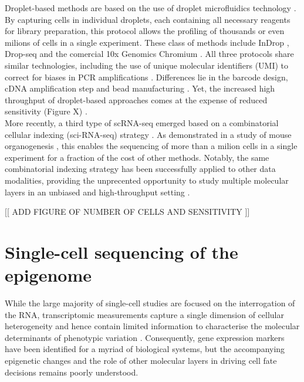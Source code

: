 Droplet-based methods are based on the use of droplet microfluidics technology \cite{Zhang2018}. By capturing cells in individual droplets, each containing all necessary reagents for library preparation, this protocol allows the profiling of thousands or even milions of cells in a single experiment. These class of methods include InDrop \cite{Klein2015,Zilionis2017}, Drop-seq\cite{Macosko2015} and the comercial 10x Genomics Chromium \cite{Zheng2017}. All three protocols share similar technologies, including the use of unique molecular identifiers (UMI) to correct for biases in PCR amplifications \cite{Kivioja2011}. Differences lie in the barcode design, cDNA amplification step and bead manufacturing \cite{Zhang2019}. Yet, the increased high throughput of droplet-based approaches comes at the expense of reduced sensitivity (Figure X) \cite{Ziegenhain2017}.\\

More recently, a third type of scRNA-seq emerged based on a combinatorial cellular indexing (sci-RNA-seq) strategy \cite{Cao2017}. As demonstrated in a study of mouse organogenesis \cite{Cao2019}, this enables the sequencing of more than a milion cells in a single experiment for a fraction of the cost of other methods. Notably, the same combinatorial indexing strategy has been successfully applied to other data modalities, providing the unprecented opportunity to study multiple molecular layers in an unbiased and high-throughput setting \cite{Vitak2017, Ramani2017, Mulqueen2018}.


[[ ADD FIGURE OF NUMBER OF CELLS AND SENSITIVITY ]]


\section{Single-cell sequencing of the epigenome}

While the large majority of single-cell studies are focused on the interrogation of the RNA, transcriptomic measurements capture a single dimension of cellular heterogeneity and hence contain limited information to characterise the molecular determinants of phenotypic variation \cite{??}. Consequently, gene expression markers have been identified for a myriad of biological systems, but the accompanying epigenetic changes and the role of other molecular layers in driving cell fate decisions remains poorly understood.

